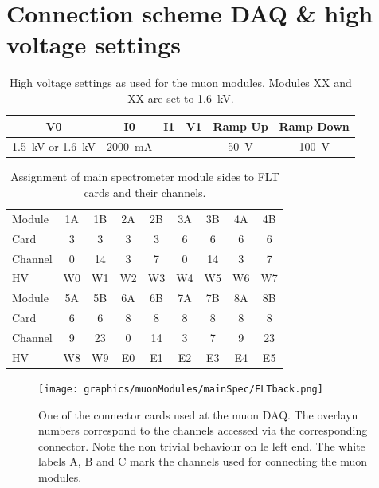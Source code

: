 \section{Connection scheme DAQ \& high voltage settings}

    \begin{table}[h]
  \centering
  	\begin{tabular}{|c|c|c|c|c|c|}
  	\hline
  		V0 & I0 & I1 & V1 & Ramp Up & Ramp Down\\
  		\hline
  		\SI{1.5}{\kilo\volt} or \SI{1.6}{\kilo\volt} & \SI{2000}{\milli\ampere} & & & \SI{50}{\volt} & \SI{100}{\volt}\\
  		\hline
  	\end{tabular}
  	\caption[High voltage settings]{High voltage settings as used for the muon modules. Modules XX and XX are set to \SI{1.6}{\kilo\volt}.}
  	\label{tab:HVSettings}
  \end{table}
\begin{table}[h]
  	\centering
  	\begin{tabular}{| l | c c | c c | c c | c c |}
  	\hline
  		Module	& 1A	& 1B	& 2A	& 2B	& 3A	& 3B	& 4A	& 4B 	\\
  		Card	& 3	& 3	& 3	& 3	& 6	& 6	& 6	& 6	\\
  		Channel	& 0	& 14	& 3	& 7	& 0	& 14	& 3	& 7	\\
  		HV		& W0 & W1 & W2 & W3 & W4 & W5 & W6 & W7 \\
  		\hline \hline
  		Module	&5A	& 5B	& 6A	& 6B	& 7A	& 7B	& 8A	& 8B	\\
  		Card	& 6	& 6	& 8	& 8	& 8	& 8	& 8	& 8	\\
  		Channel	& 9	& 23	& 0	& 14	& 3	& 7	& 9	& 23	\\
  		HV		& W8 & W9 & E0 & E1 & E2 & E3 & E4 & E5\\
  		\hline
  	\end{tabular}
  	
  	\caption[Main spectrometer DAQ channel assignment]{Assignment of main spectrometer module sides to FLT cards and their channels.}
  	\label{tab:connectionsModulesCards}
  \end{table}
  \begin{figure}[H]
	\centering
  	\texttt{[image: graphics/muonModules/mainSpec/FLTback.png]}
  	\caption[FLT connector card]{One of the connector cards used at the muon DAQ. The overlayn numbers correspond to the channels accessed via the corresponding connector. Note the non trivial behaviour on le left end. The white labels A, B and C mark the channels used for connecting the muon modules.}
  	\label{fig:FLTback}
  \end{figure}
  

